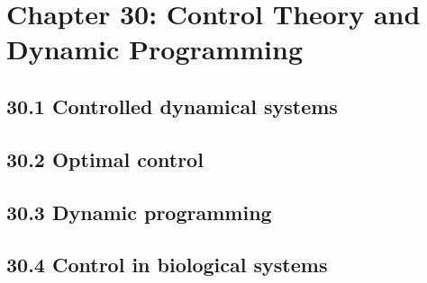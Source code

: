 \section{Chapter 30: Control Theory and Dynamic Programming}

\subsection{30.1 Controlled dynamical systems}

\subsection{30.2 Optimal control}

\subsection{30.3 Dynamic programming}

\subsection{30.4 Control in biological systems}

\clearpage
